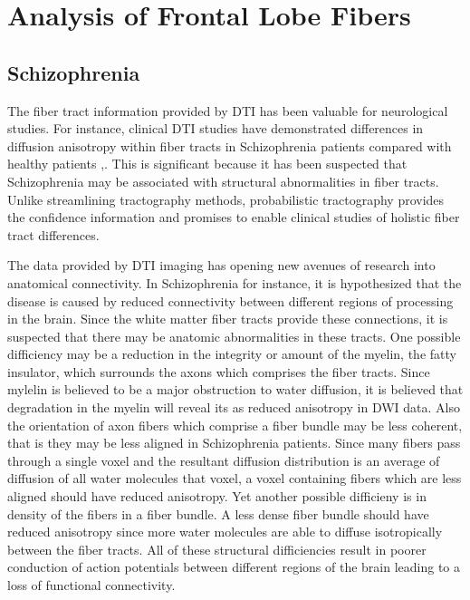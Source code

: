 \chapter{Analysis of Frontal Lobe Fibers}

\section{Schizophrenia}
The fiber tract information provided by DTI has been valuable for neurological studies.  For instance, clinical DTI studies have demonstrated differences in diffusion anisotropy within fiber tracts in Schizophrenia patients compared with healthy patients \cite{kubickiBiologPsych03},\cite{kubickiNI05}.  This is significant because it has been suspected that Schizophrenia may be associated with structural abnormalities in fiber tracts.    Unlike streamlining tractography methods, probabilistic tractography provides the confidence information and promises to enable clinical studies of holistic fiber tract differences.

The data provided by DTI imaging has opening new avenues of research into anatomical connectivity.  In Schizophrenia for instance, it is hypothesized that the disease is caused by reduced connectivity between different regions of processing in the brain.  Since the white matter fiber tracts provide these connections, it is suspected that there may be anatomic abnormalities in these tracts.  One possible difficiency may be a reduction in the integrity or amount of the myelin, the fatty insulator, which surrounds the axons which comprises the fiber tracts.  Since mylelin is believed to be a major obstruction to water diffusion, it is believed that degradation in the myelin will reveal its as reduced anisotropy in DWI data.  Also the orientation of axon fibers which comprise a fiber bundle may be less coherent, that is they may be less aligned in Schizophrenia patients.  Since many fibers pass through a single voxel and the resultant diffusion distribution is an average of diffusion of all water molecules that voxel, a voxel containing fibers which are less aligned should have reduced anisotropy.  Yet another possible difficieny is in density of the fibers in a fiber bundle.  A less dense fiber bundle should have reduced anisotropy since more water molecules are able to diffuse isotropically between the fiber tracts. All of these structural difficiencies result in poorer conduction of action potentials between different regions of the brain leading to a loss of functional connectivity.

